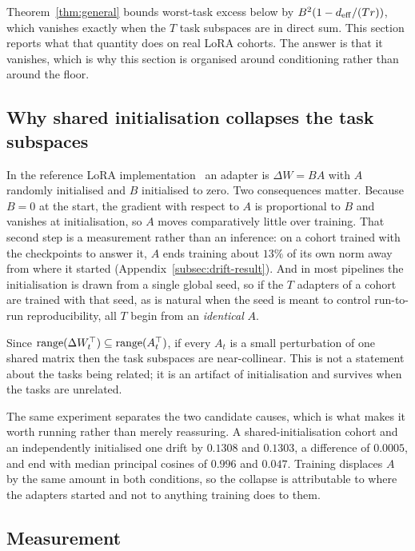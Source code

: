 Theorem~\ref{thm:general} bounds worst-task excess below by
$B^2(1 - d_{\mathrm{eff}}/(Tr))$, which vanishes exactly when the $T$ task subspaces are
in direct sum. This section reports what that quantity does on real LoRA
cohorts. The answer is that it vanishes, which is why this section is
organised around conditioning rather than around the floor.

\subsection{Why shared initialisation collapses the task subspaces}
\label{subsec:mechanism}

In the reference LoRA implementation~\citep{hu2022lora} an adapter is
$\Delta W = BA$ with $A$ randomly initialised and $B$ initialised to zero. Two
consequences matter. Because $B = 0$ at the start, the gradient with respect
to $A$ is proportional to $B$ and vanishes at initialisation, so $A$ moves
comparatively little over training. That second step is a measurement rather
than an inference: on a cohort trained with the checkpoints to answer it, $A$
ends training about $13\%$ of its own norm away from where it started
(Appendix~\ref{subsec:drift-result}). And in most pipelines the initialisation
is drawn from a single global seed, so if the $T$ adapters of a cohort are
trained with that seed, as is natural when the seed is meant to control
run-to-run reproducibility, all $T$ begin from an \emph{identical} $A$.

Since $\operatorname{range}(\Delta W_t^\top) \subseteq \operatorname{range}(A_t^\top)$, if every $A_t$ is
a small perturbation of one shared matrix then the task subspaces are
near-collinear. This is not a statement about the tasks being related; it is
an artifact of initialisation and survives when the tasks are unrelated.

The same experiment separates the two candidate causes, which is what makes it
worth running rather than merely reassuring. A shared-initialisation cohort and
an independently initialised one drift by $0.1308$ and $0.1303$, a difference
of $0.0005$, and end with median principal cosines of $0.996$ and $0.047$.
Training displaces $A$ by the same amount in both conditions, so the collapse
is attributable to where the adapters started and not to anything training
does to them.

\subsection{Measurement}
\label{subsec:measurement}

